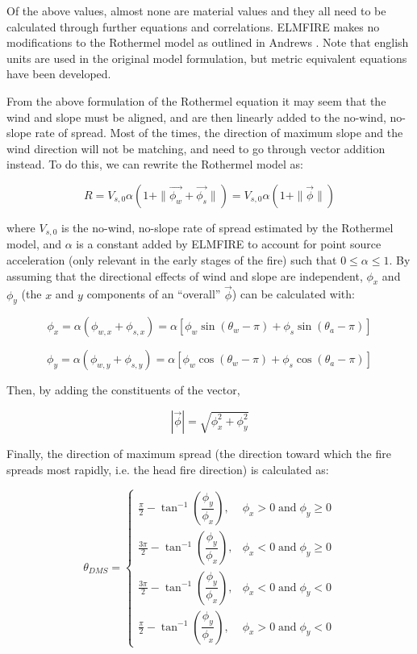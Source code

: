 Of the above values, almost none are material values and they all need to be calculated through further equations and correlations. ELMFIRE makes no modifications to the Rothermel model as outlined in Andrews \cite{andrewsRothermelSurfaceFire2018}. Note that english units are used in the original model formulation, but metric equivalent equations have been developed.

From the above formulation of the Rothermel equation it may seem that the wind and slope must be aligned, and are then linearly added to the no-wind, no-slope rate of spread. Most of the times, the direction of maximum slope and the wind direction will not be matching, and need to go through vector addition instead. To do this, we can rewrite the Rothermel model as:

\begin{equation}
    R=V_{s,0}\alpha(1+ \| \vec{\phi_w}+\vec{\phi_s} \| ) =V_{s,0}\alpha(1+ \| \vec{\phi} \| )  
\end{equation}

where $V_{s,0}$ is the no-wind, no-slope rate of spread estimated by the Rothermel model, and $\alpha$ is a constant added by ELMFIRE to account for point source acceleration (only relevant in the early stages of the fire) such that $0 \leq \alpha \leq 1$. By assuming that the directional effects of wind and slope are independent, $\phi_x$ and $\phi_y$ (the $x$ and $y$ components of an “overall” $\vec{\phi}$) can be calculated with:

\[
\phi_{x} = \alpha(\phi_{w,x} + \phi_{s,x})
         = \alpha\!\left[\phi_{w} \sin(\theta_{w}-\pi) + 
                         \phi_{s} \sin(\theta_{a}-\pi)\right]
\]

\[
\phi_{y} = \alpha(\phi_{w,y} + \phi_{s,y})
         = \alpha\!\left[\phi_{w} \cos(\theta_{w}-\pi) + 
                         \phi_{s} \cos(\theta_{a}-\pi)\right]
\]

Then, by adding the constituents of the vector, 

\[
|\vec{\phi}| = \sqrt{\phi_{x}^{2} + \phi_{y}^{2}}
\]

Finally, the direction of maximum spread (the direction toward which the fire spreads most rapidly, i.e. the head fire direction) is calculated as:

\[
\theta_{DMS} =
\begin{cases}
\frac{\pi}{2} - \tan^{-1}\!\left(\dfrac{\phi_{y}}{\phi_{x}}\right),
    & \phi_{x} > 0 \;\text{and}\; \phi_{y} \ge 0 \\[1em]

\frac{3\pi}{2} - \tan^{-1}\!\left(\dfrac{\phi_{y}}{\phi_{x}}\right),
    & \phi_{x} < 0 \;\text{and}\; \phi_{y} \ge 0 \\[1em]

\frac{3\pi}{2} - \tan^{-1}\!\left(\dfrac{\phi_{y}}{\phi_{x}}\right),
    & \phi_{x} < 0 \;\text{and}\; \phi_{y} < 0 \\[1em]

\frac{\pi}{2} - \tan^{-1}\!\left(\dfrac{\phi_{y}}{\phi_{x}}\right),
    & \phi_{x} > 0 \;\text{and}\; \phi_{y} < 0
\end{cases}
\]

